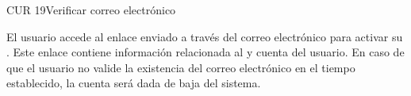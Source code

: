 \begin{UseCase}{CUR 19}{Verificar correo electrónico}
    {
	El usuario accede al enlace enviado a través del correo electrónico para activar su . Este enlace contiene información relacionada al  y cuenta del usuario. En caso de que el usuario no valide la existencia del correo electrónico en el tiempo establecido, la cuenta será dada de baja del sistema.

    }

    


\end{UseCase}
